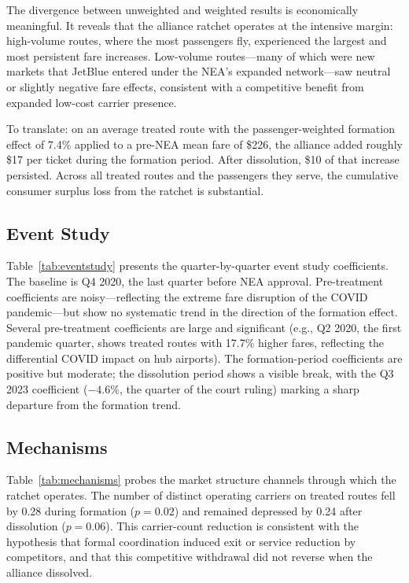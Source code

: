 \documentclass[12pt]{article}
\begin{document}
The divergence between unweighted and weighted results is economically meaningful. It reveals that the alliance ratchet operates at the intensive margin: high-volume routes, where the most passengers fly, experienced the largest and most persistent fare increases. Low-volume routes---many of which were new markets that JetBlue entered under the NEA's expanded network---saw neutral or slightly negative fare effects, consistent with a competitive benefit from expanded low-cost carrier presence.

To translate: on an average treated route with the passenger-weighted formation effect of 7.4\% applied to a pre-NEA mean fare of \$226, the alliance added roughly \$17 per ticket during the formation period. After dissolution, \$10 of that increase persisted. Across all treated routes and the passengers they serve, the cumulative consumer surplus loss from the ratchet is substantial.

\subsection{Event Study}



Table~\ref{tab:eventstudy} presents the quarter-by-quarter event study coefficients. The baseline is Q4 2020, the last quarter before NEA approval. Pre-treatment coefficients are noisy---reflecting the extreme fare disruption of the COVID pandemic---but show no systematic trend in the direction of the formation effect. Several pre-treatment coefficients are large and significant (e.g., Q2 2020, the first pandemic quarter, shows treated routes with 17.7\% higher fares, reflecting the differential COVID impact on hub airports). The formation-period coefficients are positive but moderate; the dissolution period shows a visible break, with the Q3 2023 coefficient ($-4.6\%$, the quarter of the court ruling) marking a sharp departure from the formation trend.

\subsection{Mechanisms}



Table~\ref{tab:mechanisms} probes the market structure channels through which the ratchet operates. The number of distinct operating carriers on treated routes fell by 0.28 during formation ($p = 0.02$) and remained depressed by 0.24 after dissolution ($p = 0.06$). This carrier-count reduction is consistent with the hypothesis that formal coordination induced exit or service reduction by competitors, and that this competitive withdrawal did not reverse when the alliance dissolved.
\end{document}

